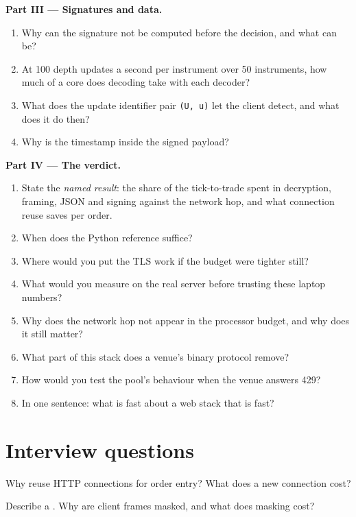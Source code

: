 \begin{problem}
\medskip\noindent\textbf{Part III --- Signatures and data.}
\begin{enumerate}[resume]
\item Why can the signature not be computed before the decision, and what can be?
\item At 100 depth updates a second per instrument over 50 instruments, how much of a core does decoding take with each
decoder?
\item What does the update identifier pair \texttt{(U, u)} let the client detect, and what does it do then?
\item Why is the timestamp inside the signed payload?
\end{enumerate}

\medskip\noindent\textbf{Part IV --- The verdict.}
\begin{enumerate}[resume]
\item State the \emph{named result}: the share of the tick-to-trade spent in decryption, framing, JSON and signing against the
network hop, and what connection reuse saves per order.
\item When does the Python reference suffice?
\item Where would you put the TLS work if the budget were tighter still?
\item What would you measure on the real server before trusting these laptop numbers?
\item Why does the network hop not appear in the processor budget, and why does it still matter?
\item What part of this stack does a venue's binary protocol remove?
\item How would you test the pool's behaviour when the venue answers 429?
\item In one sentence: what is fast about a web stack that is fast?
\end{enumerate}
\end{problem}

\section{Interview questions}

\begin{interviewq}\label{iq:ll:websocket-rest-tls-and-json-at-speed:1}
Why reuse HTTP connections for order entry? What does a new connection cost?
\end{interviewq}

\begin{interviewq}\label{iq:ll:websocket-rest-tls-and-json-at-speed:2}
Describe a . Why are client frames masked, and what does masking cost?
\end{interviewq}

